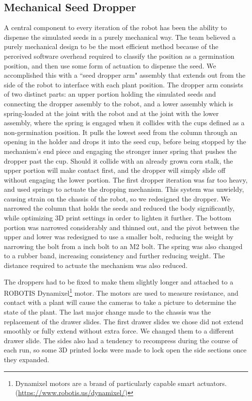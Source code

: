 \documentclass[11pt, hidelinks]{report}
\begin{document}
\subsection{Mechanical Seed Dropper}
A central component to every iteration of the robot has been the ability to dispense the simulated seeds in a purely mechanical way. The team believed a purely mechanical design to be the most efficient method because of the perceived software overhead required to classify the position as a germination position, and then use some form of actuation to dispense the seed. We accomplished this with a ``seed dropper arm" assembly that extends out from the side of the robot to interface with each plant position. The dropper arm consists of two distinct parts: an upper portion holding the simulated seeds and connecting the dropper assembly to the robot, and a lower assembly which is spring-loaded at the joint with the robot and at the joint with the lower assembly, where the spring is engaged when it collides with the cups defined as a non-germination position. It pulls the lowest seed from the column through an opening in the holder and drops it into the seed cup, before being stopped by the mechanism’s end piece and engaging the stronger inner spring that pushes the dropper past the cup.  Should it collide with an already grown corn stalk, the upper portion will make contact first, and the dropper will simply slide off without engaging the lower portion. The first dropper iteration was far too heavy, and used springs to actuate the dropping mechanism.  This system was unwieldy, causing strain on the chassis of the robot, so we redesigned the dropper.  We narrowed the column that holds the seeds and reduced the body significantly, while optimizing 3D print settings in order to lighten it further.  The bottom portion was narrowed considerably and thinned out, and the pivot between the upper and lower was redesigned to use a smaller bolt, reducing the weight by narrowing the bolt from a  inch bolt to an M2 bolt.  The spring was also changed to a rubber band, increasing consistency and further reducing weight.  The distance required to actuate the mechanism was also reduced.

The droppers had to be fixed to make them slightly longer and attached to a ROBOTIS Dynamixel\footnote{Dynamixel motors are a brand of particularly capable smart actuators. (\url{https://www.robotis.us/dynamixel/})} motor.  The motors are used to measure resistance, and contact with a plant will cause the cameras to take a picture to determine the state of the plant.  
The last major change made to the chassis was the replacement of the drawer slides.  The first drawer slides we chose did not extend smoothly or fully extend without extra force.  We changed them to a different drawer slide. The sides also had a tendency to recompress during the course of each run, so some 3D printed locks were made to lock open the side sections once they expanded.
\end{document}
